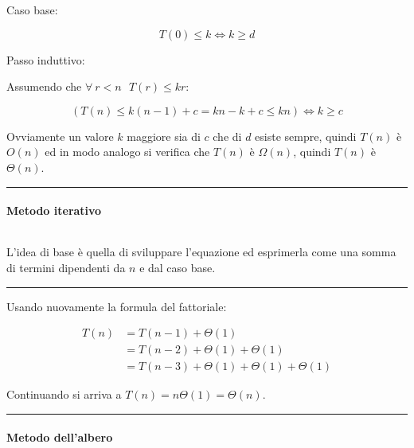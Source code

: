 \documentclass{article}
\begin{document}
\noindent Caso base:\newline

$$T(0)\leq k\iff k\geq d$$\newline

\noindent Passo induttivo:\newline

 Assumendo che $\forall\ r<n \ \ \ T(r)\leq kr$:

$$(T(n)\leq k(n-1)+c=kn-k+c\leq kn)\iff k\geq c$$\newline

\noindent Ovviamente un valore $k$ maggiore sia di $c$ che di $d$ esiste sempre, quindi $T(n)$ è $O(n)$ ed in modo analogo si verifica che $T(n)$ è $\Omega(n)$, quindi $T(n)$ è $\Theta(n)$.

\noindent\rule{\textwidth}{0.5pt}\newline

\paragraph{Metodo iterativo} $\ $\newline

\noindent L'idea di base è quella di sviluppare l'equazione ed esprimerla come una somma di termini dipendenti da $n$ e dal caso base.\newline

\noindent\rule{\textwidth}{0.5pt}\newline

\noindent Usando nuovamente la formula del fattoriale:

\begin{equation}
\nonumber
    \begin{split}
        T(n) & =T(n-1)+\Theta(1)\\
        & =T(n-2)+\Theta(1)+\Theta(1)\\
        & =T(n-3)+\Theta(1)+\Theta(1)+\Theta(1)
    \end{split}
\end{equation}

\noindent Continuando si arriva a $T(n)=n\Theta(1)=\Theta(n)$.

\noindent\rule{\textwidth}{0.5pt}\newline

\newpage

\paragraph{Metodo dell'albero} $\ $\newline
\end{document}
